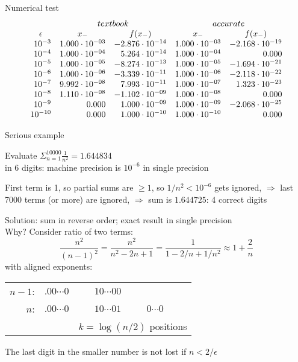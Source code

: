\begin{numberedframe}{Numerical test}
\begin{equation}
  \begin{array}{rrrrr}
    &\multicolumn{2}{c}{textbook}&\multicolumn{2}{c}{accurate}\\
    \multicolumn{1}{c}{\epsilon} &\multicolumn{1}{c}{x_-} &\multicolumn{1}{c}{f(x_-)} &\multicolumn{1}{c}{x_-} &\multicolumn{1}{c}{f(x_-)}\\
    10^{-3}& 1.000\cdot 10^{-03}& -2.876\cdot 10^{-14}&  1.000\cdot 10^{-03}&  -2.168\cdot 10^{-19}\\
    10^{-4}& 1.000\cdot 10^{-04}&  5.264\cdot 10^{-14}&  1.000\cdot 10^{-04}&   0.000\\
    10^{-5}& 1.000\cdot 10^{-05}& -8.274\cdot 10^{-13}&  1.000\cdot 10^{-05}&  -1.694\cdot 10^{-21}\\
    10^{-6}& 1.000\cdot 10^{-06}& -3.339\cdot 10^{-11}&  1.000\cdot 10^{-06}&  -2.118\cdot 10^{-22}\\
    10^{-7}& 9.992\cdot 10^{-08}&  7.993\cdot 10^{-11}&  1.000\cdot 10^{-07}&   1.323\cdot 10^{-23}\\
    10^{-8}&  1.110\cdot 10^{-08}& -1.102\cdot 10^{-09}&  1.000\cdot 10^{-08}&   0.000\\
    10^{-9}&  0.000&  1.000\cdot 10^{-09}&  1.000\cdot 10^{-09}&  -2.068\cdot 10^{-25}\\
    10^{-10}& 0.000&  1.000\cdot 10^{-10}&  1.000\cdot 10^{-10}&   0.000\\
  \end{array}
\end{equation}
\end{numberedframe}

\begin{numberedframe}{Serious example}
  \small

Evaluate $\Sigma_{n=1}^{10000}\frac{1}{n^2}=1.644834$ \\
in 6 digits: machine precision is $10^{-6}$ in single precision

First term is 1, so partial sums are $\geq1$, so $1/n^2<10^{-6}$ gets
ignored,
$\Rightarrow$ last 7000 terms (or more) are ignored,
$\Rightarrow$ sum is $1.644725$: 4 correct digits

Solution: sum in reverse order; exact result in single precision\\
Why? Consider ratio of two terms:
\[ \frac{n^2}{(n-1)^2}=\frac{n^2}{n^2-2n+1}=\frac1{1-2/n+1/n^2}
    \approx 1+\frac2n
\]
with aligned exponents:\\
\begin{tabular}{rrcl}
  $n-1$:&$.00\cdots0$&$10\cdots00$\\
  $n$:&  $.00\cdots0$&$10\cdots01$&$0\cdots0$\\
      &             &\multicolumn{2}{l}{$k=\log(n/2)$ positions}
\end{tabular}

The last digit in the smaller number is not lost if $n<2/\epsilon$
\end{numberedframe}

